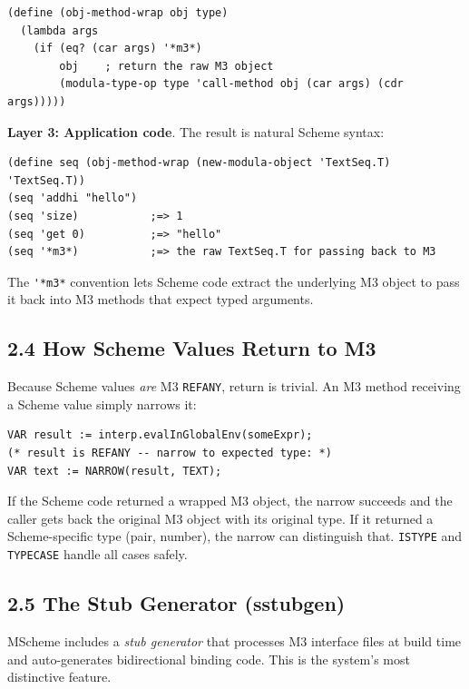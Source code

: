 \documentclass[
  12pt,
]{report}
\newcommand{\passthrough}[1]{#1}
\begin{document}
\begin{lstlisting}
(define (obj-method-wrap obj type)
  (lambda args
    (if (eq? (car args) '*m3*)
        obj    ; return the raw M3 object
        (modula-type-op type 'call-method obj (car args) (cdr args)))))
\end{lstlisting}

\textbf{Layer 3: Application code}. The result is natural Scheme syntax:

\begin{lstlisting}
(define seq (obj-method-wrap (new-modula-object 'TextSeq.T) 'TextSeq.T))
(seq 'addhi "hello")
(seq 'size)           ;=> 1
(seq 'get 0)          ;=> "hello"
(seq '*m3*)           ;=> the raw TextSeq.T for passing back to M3
\end{lstlisting}

The \passthrough{\lstinline!'*m3*!} convention lets Scheme code extract
the underlying M3 object to pass it back into M3 methods that expect
typed arguments.

\subsection{2.4 How Scheme Values Return to
M3}\label{how-scheme-values-return-to-m3}

Because Scheme values \emph{are} M3 \passthrough{\lstinline!REFANY!},
return is trivial. An M3 method receiving a Scheme value simply narrows
it:

\begin{lstlisting}
VAR result := interp.evalInGlobalEnv(someExpr);
(* result is REFANY -- narrow to expected type: *)
VAR text := NARROW(result, TEXT);
\end{lstlisting}

If the Scheme code returned a wrapped M3 object, the narrow succeeds and
the caller gets back the original M3 object with its original type. If
it returned a Scheme-specific type (pair, number), the narrow can
distinguish that. \passthrough{\lstinline!ISTYPE!} and
\passthrough{\lstinline!TYPECASE!} handle all cases safely.

\subsection{2.5 The Stub Generator
(sstubgen)}\label{the-stub-generator-sstubgen}

MScheme includes a \emph{stub generator} that processes M3 interface
files at build time and auto-generates bidirectional binding code. This
is the system's most distinctive feature.
\end{document}
